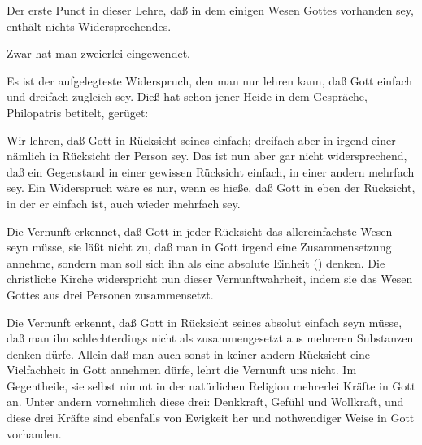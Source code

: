 Der erste Punct in dieser Lehre, daß in dem einigen Wesen Gottes  vorhanden sey, enthält nichts Widersprechendes.\par
Zwar hat man zweierlei eingewendet.\par
{} Es ist der aufgelegteste Widerspruch, den man nur lehren kann, daß Gott einfach und dreifach zugleich sey. Dieß hat schon jener Heide in dem Gespräche, Philopatris betitelt, gerüget: \par
{} Wir lehren, daß Gott in Rücksicht seines  einfach; dreifach aber in irgend einer  nämlich in Rücksicht der Person sey. Das ist nun aber gar nicht widersprechend, daß ein Gegenstand in einer gewissen Rücksicht einfach, in einer andern mehrfach sey. Ein Widerspruch wäre es nur, wenn es hieße, daß Gott in eben der Rücksicht, in der er einfach ist, auch wieder mehrfach sey.\par
{} Die Vernunft erkennet, daß Gott in jeder Rücksicht das allereinfachste Wesen seyn müsse, sie läßt nicht zu, daß man in Gott irgend eine Zusammensetzung annehme, sondern man soll sich ihn als eine absolute Einheit () denken. Die christliche Kirche widerspricht nun dieser Vernunftwahrheit, indem sie das Wesen Gottes aus drei Personen zusammensetzt.~\par
{} Die Vernunft erkennt, daß Gott in Rücksicht seines  absolut einfach seyn müsse, \dh\, daß man ihn schlechterdings nicht als zusammengesetzt aus mehreren Substanzen denken dürfe. Allein daß man auch sonst in keiner andern Rücksicht eine Vielfachheit in Gott annehmen dürfe, lehrt die Vernunft uns nicht. Im Gegentheile, sie selbst nimmt in der natürlichen Religion mehrerlei Kräfte in Gott an. Unter andern vornehmlich diese drei: Denkkraft, Gefühl und Wollkraft, und diese drei Kräfte sind ebenfalls von Ewigkeit her und nothwendiger Weise in Gott vorhanden.

